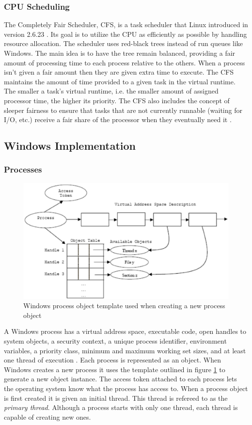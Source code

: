 \documentclass[onecolumn,draftclsnofoot, 10pt, compsoc]{IEEEtran}
\begin{document}
		\subsubsection{CPU Scheduling}
			The Completely Fair Scheduler, CFS, is a task scheduler that Linux introduced in version 2.6.23 \cite{schedulerLinux}. 
			Its goal is to utilize the CPU as efficiently as possible by handling resource allocation. 
			The scheduler uses red-black trees instead of run queues like Windows.
			The main idea is to have the tree remain balanced, providing a fair amount of processing time to each process relative to the others. 
			When a process isn't given a fair amount then they are given extra time to execute.
			The CFS maintains the amount of time provided to a given task in the virtual runtime. 
			The smaller a task's virtual runtime, i.e. the smaller amount of assigned processor time, the higher its priority. 
			The CFS also includes the concept of sleeper fairness to ensure that tasks that are not currently runnable (waiting for I/O, etc.) receive a fair share of the processor when they eventually need it \cite{schedulerLinux}.


	\subsection{Windows Implementation}
		\subsubsection{Processes}
			\begin{figure}[H]
				\includegraphics[width=.6\textwidth]{windowsProcessTemplate.eps}
				\centering
				\caption{Windows process object template used when creating a new process object \cite{windowsProcessMSDN}}
				\label{fig:mesh1}
			\end{figure}
		
			A Windows process has a virtual address space, executable code, open handles to system objects, a security context, a unique process identifier, environment variables, a priority class, minimum and maximum working set sizes, and at least one thread of execution \cite{windowsProcessMSDN}.
			Each process is represented as an object.
			When Windows creates a new process it uses the template outlined in figure \ref{fig:mesh1} to generate a new object instance. 
			The access token attached to each process lets the operating system know what the process has access to.
			When a process object is first created it is given an initial thread.
			This thread is refereed to as the \textit{primary thread}.
			Although a process starts with only one thread, each thread is capable of creating new ones.
	
\end{document}

